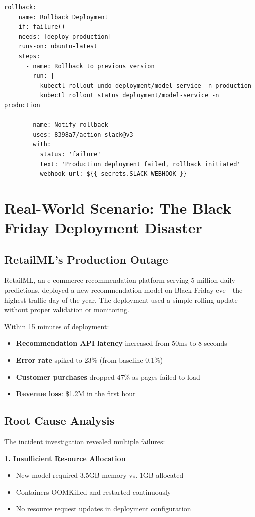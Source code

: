 \begin{lstlisting}[style=yaml, caption={CI/CD Pipeline with GitHub Actions}]
  rollback:
    name: Rollback Deployment
    if: failure()
    needs: [deploy-production]
    runs-on: ubuntu-latest
    steps:
      - name: Rollback to previous version
        run: |
          kubectl rollout undo deployment/model-service -n production
          kubectl rollout status deployment/model-service -n production

      - name: Notify rollback
        uses: 8398a7/action-slack@v3
        with:
          status: 'failure'
          text: 'Production deployment failed, rollback initiated'
          webhook_url: ${{ secrets.SLACK_WEBHOOK }}
\end{lstlisting}

\section{Real-World Scenario: The Black Friday Deployment Disaster}

\subsection{RetailML's Production Outage}

RetailML, an e-commerce recommendation platform serving 5 million daily predictions, deployed a new recommendation model on Black Friday eve---the highest traffic day of the year. The deployment used a simple rolling update without proper validation or monitoring.

Within 15 minutes of deployment:
\begin{itemize}
    \item \textbf{Recommendation API latency} increased from 50ms to 8 seconds
    \item \textbf{Error rate} spiked to 23\% (from baseline 0.1\%)
    \item \textbf{Customer purchases} dropped 47\% as pages failed to load
    \item \textbf{Revenue loss}: \$1.2M in the first hour
\end{itemize}

\subsection{Root Cause Analysis}

The incident investigation revealed multiple failures:

\textbf{1. Insufficient Resource Allocation}
\begin{itemize}
    \item New model required 3.5GB memory vs. 1GB allocated
    \item Containers OOMKilled and restarted continuously
    \item No resource request updates in deployment configuration
\end{itemize}

